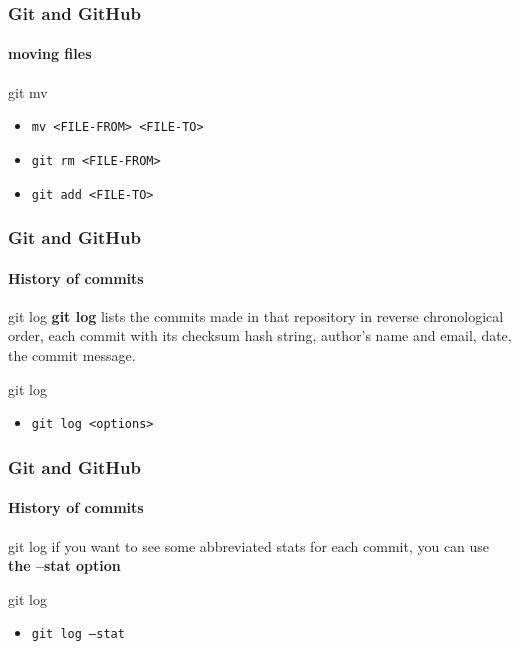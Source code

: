 \begin{frame}
	\frametitle{Git and GitHub}
    \framesubtitle{moving files}
    \addtocounter{nframe}{1}

	\begin{block}{git mv}
		\begin{itemize}
			\item \texttt{mv <FILE-FROM> <FILE-TO>}
			\item \texttt{git rm <FILE-FROM>}
			\item \texttt{git add <FILE-TO>}
		\end{itemize}
	\end{block}
\end{frame}

\begin{frame}
	\frametitle{Git and GitHub}
    \framesubtitle{History of commits}
    \addtocounter{nframe}{1}

	\begin{block}{git log}
		\textbf{git log} lists the commits made in that repository in reverse chronological order, each commit with its checksum hash string, author’s name and email, date, the commit message.
	\end{block}

	\begin{block}{git log}
		\begin{itemize}
			\item \texttt{git log <options>}
		\end{itemize}
	\end{block}

\end{frame}

\begin{frame}
	\frametitle{Git and GitHub}
    \framesubtitle{History of commits}
    \addtocounter{nframe}{1}

	\begin{block}{git log}
		if you want to see some abbreviated stats for each commit, you can use \textbf{the --stat option}
	\end{block}

	\begin{block}{git log}
		\begin{itemize}
			\item \texttt{git log --stat}
		\end{itemize}
	\end{block}

\end{frame}

